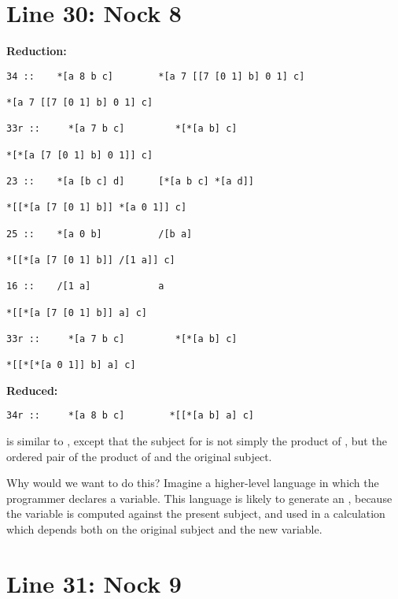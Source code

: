 \section{Line 30: Nock 8}

\textbf{ Reduction:}

\begin{framed_shaded}
\begin{Verbatim}[fontsize=\relsize{-2.5},commandchars=\\\{\}]
34 ::    *[a 8 b c]        *[a 7 [[7 [0 1] b] 0 1] c]

*[a 7 [[7 [0 1] b] 0 1] c]   

33r ::     *[a 7 b c]         *[*[a b] c]

*[*[a [7 [0 1] b] 0 1]] c]

23 ::    *[a [b c] d]      [*[a b c] *[a d]]

*[[*[a [7 [0 1] b]] *[a 0 1]] c]

25 ::    *[a 0 b]          /[b a]

*[[*[a [7 [0 1] b]] /[1 a]] c]

16 ::    /[1 a]            a

*[[*[a [7 [0 1] b]] a] c]

33r ::     *[a 7 b c]         *[*[a b] c]

*[[*[*[a 0 1]] b] a] c]
\end{Verbatim}
\end{framed_shaded}
\textbf{ Reduced:}

\begin{framed_shaded}
\begin{Verbatim}[fontsize=\relsize{-2.5},commandchars=\\\{\}]
34r ::     *[a 8 b c]        *[[*[a b] a] c]
\end{Verbatim}
\end{framed_shaded}
  is similar to , except that the subject for  is not simply the
 product of , but the ordered pair of the product of  and the original
 subject. 

Why would we want to do this?  Imagine a higher-level language in which the
programmer declares a variable.  This language is likely to generate an ,
because the variable is computed against the present subject, and used in a
calculation which depends both on the original subject and the new variable.

\section{Line 31: Nock 9}


